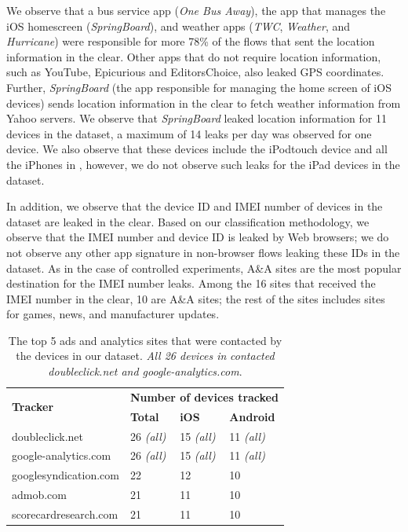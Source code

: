 We observe that a bus service app (\emph{One Bus Away}), the
app that manages the iOS homescreen (\emph{SpringBoard}), and
weather apps (\emph{TWC}, \emph{Weather}, and \emph{Hurricane})
were responsible for more 78\% of the flows that sent the location
information in the clear. Other apps that do not require location information, 
such as YouTube, Epicurious and EditorsChoice, also leaked GPS coordinates.
Further, \emph{SpringBoard} (the app responsible for managing the home screen of iOS devices) sends location information in the clear to fetch weather information from Yahoo servers. 
We observe that \emph{SpringBoard} leaked location information for 11 devices in the \mobWild dataset, a maximum of 14 leaks per day was observed for one device. 
We also observe that these devices include the iPodtouch device and all the iPhones in \mobWild, however, we do not observe such leaks for the iPad devices in the \mobWild dataset.  


In addition, we observe that the device ID and IMEI number of
devices in the \mobWild dataset are leaked in the clear.  Based on our
classification methodology, we observe that the IMEI number and device
ID is leaked by Web browsers; we do not observe any other app 
signature in non-browser flows leaking these IDs in the \mobWild dataset.  As in the case of
controlled experiments, A\&A sites are the most popular
destination for the IMEI number leaks.  Among the 16 sites that received 
the IMEI number in the clear, 10 are A\&A sites;
the rest of the sites includes sites for games, news, and manufacturer
updates.

\begin{table}
\centering
\begin{small}
\begin{tabular}{|p{}|p{}|p{}|p{}|}
\hline
\multirow{2}{*}{\bf Tracker} & \multicolumn{3}{c|}{\bf Number of devices tracked}\tabularnewline
\cline{2-4}
                      &  {\bf Total} & {\bf iOS} & {\bf Android} \tabularnewline
\hline
doubleclick.net       & 26 {\em(all)} & 15 {\em(all)} & 11 {\em(all)} \tabularnewline
\hline
google-analytics.com  & 26 {\em(all)} & 15 {\em(all)}  & 11 {\em(all)} \tabularnewline
\hline
googlesyndication.com & 22 & 12 & 10 \tabularnewline
\hline
admob.com             & 21 & 11 & 10 \tabularnewline
\hline
scorecardresearch.com &  21 & 11 & 10 \tabularnewline
\hline
\end{tabular}
\end{small}
\caption{The top 5 ads and analytics sites that were contacted by the devices in our dataset.
\emph{All 26 devices in} \mobWild \emph{contacted doubleclick.net and google-analytics.com}.}
\label{tab:top-trackers}
\end{table}

